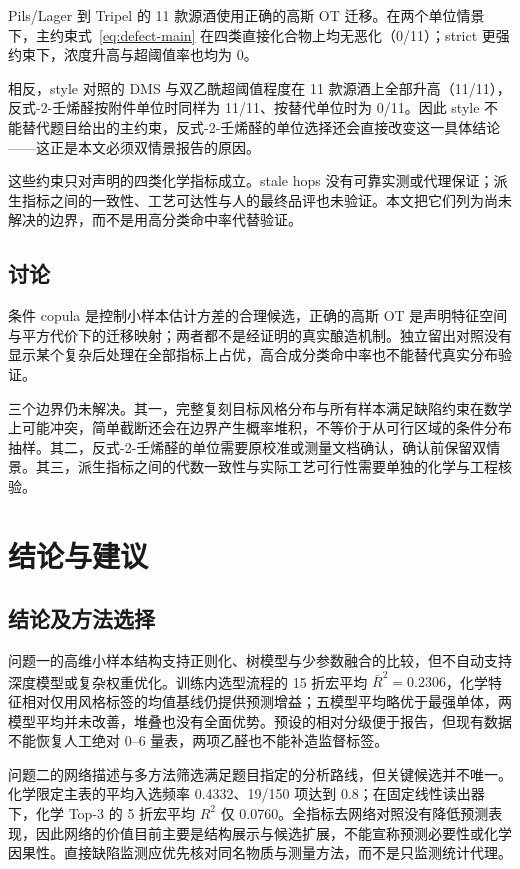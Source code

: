 \documentclass[UTF8,a4paper,zihao=-4]{ctexart}
\numberwithin{figure}{section}
\numberwithin{table}{section}
\numberwithin{equation}{section}
\begin{document}
Pils/Lager 到 Tripel 的 11 款源酒使用正确的高斯 OT 迁移。在两个单位情景下，主约束式~\eqref{eq:defect-main} 在四类直接化合物上均无恶化（0/11）；strict 更强约束下，浓度升高与超阈值率也均为 0。

相反，style 对照的 DMS 与双乙酰超阈值程度在 11 款源酒上全部升高（11/11），反式-2-壬烯醛按附件单位时同样为 11/11、按替代单位时为 0/11。因此 style 不能替代题目给出的主约束，反式-2-壬烯醛的单位选择还会直接改变这一具体结论——这正是本文必须双情景报告的原因。

这些约束只对声明的四类化学指标成立。stale hops 没有可靠实测或代理保证；派生指标之间的一致性、工艺可达性与人的最终品评也未验证。本文把它们列为尚未解决的边界，而不是用高分类命中率代替验证。

\subsection{讨论}

条件 copula 是控制小样本估计方差的合理候选，正确的高斯 OT 是声明特征空间与平方代价下的迁移映射；两者都不是经证明的真实酿造机制。独立留出对照没有显示某个复杂后处理在全部指标上占优，高合成分类命中率也不能替代真实分布验证。

三个边界仍未解决。其一，完整复刻目标风格分布与所有样本满足缺陷约束在数学上可能冲突，简单截断还会在边界产生概率堆积，不等价于从可行区域的条件分布抽样。其二，反式-2-壬烯醛的单位需要原校准或测量文档确认，确认前保留双情景。其三，派生指标之间的代数一致性与实际工艺可行性需要单独的化学与工程核验。

\section{结论与建议}
\label{sec:conclusion}

\subsection{结论及方法选择}

问题一的高维小样本结构支持正则化、树模型与少参数融合的比较，但不自动支持深度模型或复杂权重优化。训练内选型流程的 15 折宏平均 $\bar R^2=0.2306$，化学特征相对仅用风格标签的均值基线仍提供预测增益；五模型平均略优于最强单体，两模型平均并未改善，堆叠也没有全面优势。预设的相对分级便于报告，但现有数据不能恢复人工绝对 0--6 量表，两项乙醛也不能补造监督标签。

问题二的网络描述与多方法筛选满足题目指定的分析路线，但关键候选并不唯一。化学限定主表的平均入选频率 0.4332、19/150 项达到 0.8；在固定线性读出器下，化学 Top-3 的 5 折宏平均 $R^2$ 仅 0.0760。全指标去网络对照没有降低预测表现，因此网络的价值目前主要是结构展示与候选扩展，不能宣称预测必要性或化学因果性。直接缺陷监测应优先核对同名物质与测量方法，而不是只监测统计代理。
\end{document}
